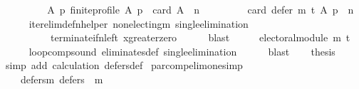 \begin{isabellebody}
%
\isadelimproof
%
\endisadelimproof
%
\isatagproof
{}\isamarkupfalse%
\ {\isacharminus}{\kern0pt}\isanewline
\ \ \isamarkupfalse%
\isanewline
\ \ \ \ {\isachardoublequoteopen}{\isasymforall}\ A\ p{\isachardot}{\kern0pt}\ finite{\isacharunderscore}{\kern0pt}profile\ A\ p\ {\isasymand}\ card\ A\ {\isasymge}\ n\ {\isasymlongrightarrow}\isanewline
\ \ \ \ \ \ \ \ card\ {\isacharparenleft}{\kern0pt}defer\ {\isacharparenleft}{\kern0pt}m\ {\isasymcirclearrowleft}\isactrlsub t{\isacharparenright}{\kern0pt}\ A\ p{\isacharparenright}{\kern0pt}\ {\isacharequal}{\kern0pt}\ n{\isachardoublequoteclose}\isanewline
\ \ \ \ \isamarkupfalse%
\ iter{\isacharunderscore}{\kern0pt}elim{\isacharunderscore}{\kern0pt}def{\isacharunderscore}{\kern0pt}n{\isacharunderscore}{\kern0pt}helper\ non{\isacharunderscore}{\kern0pt}electing{\isacharunderscore}{\kern0pt}m\ single{\isacharunderscore}{\kern0pt}elimination\isanewline
\ \ \ \ \ \ \ \ \ \ terminate{\isacharunderscore}{\kern0pt}if{\isacharunderscore}{\kern0pt}n{\isacharunderscore}{\kern0pt}left\ x{\isacharunderscore}{\kern0pt}greater{\isacharunderscore}{\kern0pt}zero\isanewline
\ \ \ \ \isamarkupfalse%
\ blast\isanewline
\ \ \isamarkupfalse%
\ \isamarkupfalse%
\ {\isachardoublequoteopen}electoral{\isacharunderscore}{\kern0pt}module\ {\isacharparenleft}{\kern0pt}m\ {\isasymcirclearrowleft}\isactrlsub t{\isacharparenright}{\kern0pt}{\isachardoublequoteclose}\isanewline
\ \ \ \ \isamarkupfalse%
\ loop{\isacharunderscore}{\kern0pt}comp{\isacharunderscore}{\kern0pt}sound\ eliminates{\isacharunderscore}{\kern0pt}def\ single{\isacharunderscore}{\kern0pt}elimination\isanewline
\ \ \ \ \isamarkupfalse%
\ blast\isanewline
\ \ \isamarkupfalse%
\ {\isacharquery}{\kern0pt}thesis\isanewline
\ \ \ \ \isamarkupfalse%
\ {\isacharparenleft}{\kern0pt}simp\ add{\isacharcolon}{\kern0pt}\ calculation\ defers{\isacharunderscore}{\kern0pt}def{\isacharparenright}{\kern0pt}\isanewline
{}\isamarkupfalse%
%
\endisatagproof
{\isafoldproof}%
%
\isadelimproof
\isanewline
%
\endisadelimproof
\isanewline
\isanewline
{}\isamarkupfalse%
\ par{\isacharunderscore}{\kern0pt}comp{\isacharunderscore}{\kern0pt}elim{\isacharunderscore}{\kern0pt}one{\isacharbrackleft}{\kern0pt}simp{\isacharbrackright}{\kern0pt}{\isacharcolon}{\kern0pt}\isanewline
\ \ \isanewline
\ \ \ \ defers{\isacharunderscore}{\kern0pt}m{\isacharunderscore}{\kern0pt}{}{\isacharcolon}{\kern0pt}\ {\isachardoublequoteopen}defers\ {}\ m{\isachardoublequoteclose}\ \isanewline

\end{isabellebody}
